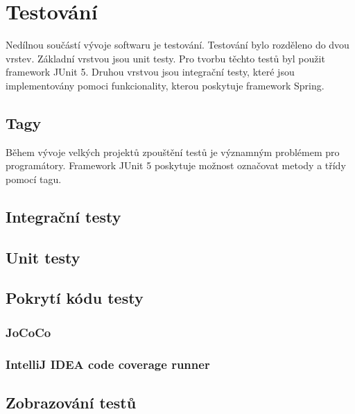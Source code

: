 \chapter{Testování}
Nedílnou součástí vývoje softwaru je testování. Testování bylo rozděleno do dvou vrstev. Základní vrstvou jsou unit testy. Pro tvorbu těchto testů byl použit framework JUnit 5. Druhou vrstvou jsou integrační testy, které jsou implementovány pomoci funkcionality, kterou poskytuje framework Spring.

\section{Tagy}
    Během vývoje velkých projektů zpouštění testů je významným problémem pro programátory. 
    Framework JUnit 5 poskytuje možnost označovat metody a třídy pomocí tagu.
    
\section{Integrační testy}
\section{Unit testy}
\section{Pokrytí kódu testy}
    \subsection{JoCoCo}
    \cite{JoCoCo}
    \subsection{IntelliJ IDEA code coverage runner}
    \cite{IntelliJ IDEA code coverage runner}
\section{Zobrazování testů}
